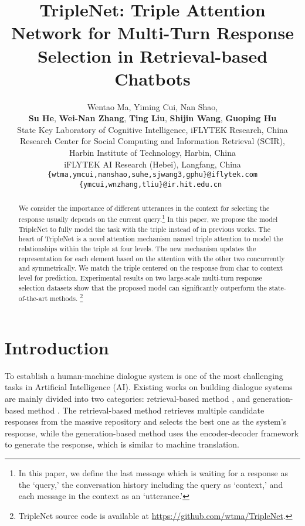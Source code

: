 \documentclass[11pt,a4paper]{article}
\title{TripleNet: Triple Attention Network for Multi-Turn Response Selection in Retrieval-based Chatbots }
\author{
Wentao Ma,
Yiming Cui,
Nan Shao,  \\
\textbf{Su He}, 
\textbf{Wei-Nan Zhang},
\textbf{Ting Liu},
\textbf{Shijin Wang},
\textbf{Guoping Hu}\\
{State Key Laboratory of Cognitive Intelligence, iFLYTEK Research, China} \\
{Research Center for Social Computing and Information Retrieval (SCIR), } \\
{Harbin Institute of Technology, Harbin, China} \\
{iFLYTEK AI Research (Hebei), Langfang, China} \\
\tt\{wtma,ymcui,nanshao,suhe,sjwang3,gphu\}@iflytek.com \\
\tt\{ymcui,wnzhang,tliu\}@ir.hit.edu.cn
}
\date{}
\begin{document}
\maketitle
\begin{abstract}
 We consider the importance of different utterances in the context for selecting the response usually depends on the current query.\footnote {In this paper, we define the last message which is waiting for a response as the `query,'  the conversation history including the query  as `context,' and  each message in the context as an `utterance.'}
 In this paper, we propose the model TripleNet to fully model the task with the triple   instead of  in previous works. 
The heart of TripleNet is a novel attention mechanism named triple attention to model the relationships within the triple at four levels. 
 The new mechanism updates the representation for each element based on the attention with the other two concurrently and symmetrically.
 We match the triple  centered on the response from char to context level for prediction.
 Experimental results on two large-scale multi-turn response selection datasets show that the proposed model can significantly outperform the state-of-the-art methods. \footnote{ TripleNet source code is available at \url{https://github.com/wtma/TripleNet}.}
 \end{abstract}

\section{Introduction}\label{introduction}
To establish a human-machine dialogue system is one of the most challenging tasks in Artificial Intelligence (AI). 
Existing works on building dialogue systems are mainly divided into two categories: retrieval-based method \cite{Yan-2016-Learning,Zhou-2016-Multi}, and generation-based method \cite{Vinyals-2015A}.
The retrieval-based method retrieves multiple candidate responses from the massive repository and selects the best one as the system's response, while the generation-based method uses the encoder-decoder framework to generate the response, which is similar to machine translation. 
\end{document}
